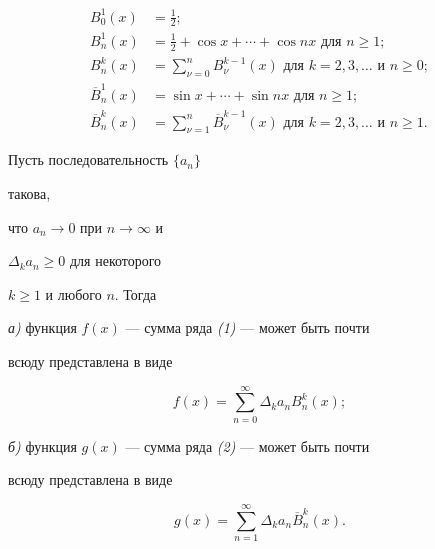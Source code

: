\begin{align*}


B^1_0(x)&=\frac{1}{2};\\


B^1_n(x)&=\frac{1}{2}+\cos x+\dotsb+\cos nx\text{ для }n\ge 1;\\


B^k_n(x)&=\sum^n_{\nu=0}B^{k-1}_\nu(x)\text{ для }k=2,3,\dotsc


\text{ и }n\ge 0;\\


\overline B^1_n(x)&=\sin x+\dotsb+\sin nx\text{ для }n\ge 1;\\


\overline B^k_n(x)&=\sum^n_{\nu=1}\overline B^{k-1}_\nu(x)


\text{ для }k=2,3,\dotsc \text{ и }n\ge 1.


\end{align*}





\begin{lem} Пусть последовательность $\{a_n\}$


такова,


что $a_n\to 0$ при $n\to \infty$ и\linebreak


$\Delta_k a_n\ge 0$ для некоторого


$k\ge 1$ и любого $n$. Тогда





{\em а)} функция $f(x)$ --- сумма ряда {\em (1)} --- может быть почти


всюду представлена в виде


$$


f(x)=\sum^\infty_{n=0}\Delta_k a_n B^k_n(x);


$$





{\em б)} функция $g(x)$ --- сумма ряда {\em (2)} --- может быть почти


всюду представлена в виде


$$


g(x)=\sum^\infty_{n=1}\Delta_k a_n\overline B^k_n(x).


$$


\end{lem}





